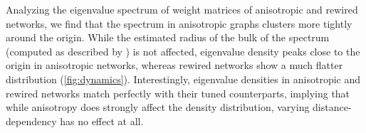 Analyzing the eigenvalue spectrum of weight matrices of anisotropic
and rewired networks, we find that the spectrum in anisotropic graphs
clusters more tightly around the origin. While the estimated radius of the
bulk of the spectrum (computed as described by \textcite{Rajan2006})
is not affected, eigenvalue density peaks close to the origin in
anisotropic networks, whereas rewired networks show a much flatter
distribution (\autoref{fig:dynamics}). Interestingly, eigenvalue
densities in anisotropic and rewired networks match perfectly with
their tuned counterparts, implying that while anisotropy does strongly
affect the density distribution, varying distance-dependency has no
effect at all.








